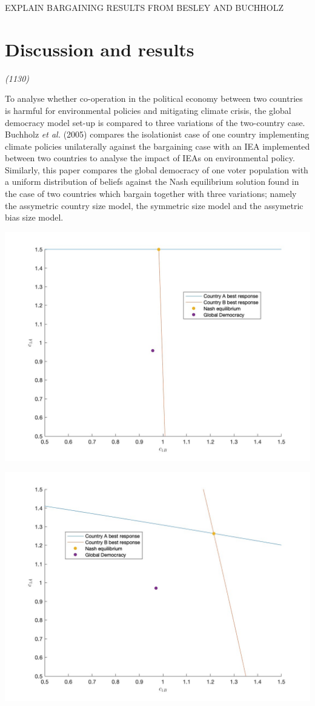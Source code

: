 \documentclass[11pt,preprint, authoryear]{elsarticle}
\let\origfigure\figure
\let\endorigfigure\endfigure
\renewenvironment{figure}[1][2] {
    \expandafter\origfigure\expandafter[H]
} {
    \endorigfigure
}
\numberwithin{equation}{section}
\numberwithin{figure}{section}
\numberwithin{table}{section}
\begin{document}
EXPLAIN BARGAINING RESULTS FROM BESLEY AND BUCHHOLZ

\hypertarget{discussion-and-results}{%
\section{Discussion and results}\label{discussion-and-results}}

\emph{(1130)}

To analyse whether co-operation in the political economy between two
countries is harmful for environmental policies and mitigating climate
crisis, the global democracy model set-up is compared to three
variations of the two-country case. Buchholz \emph{et al.} (2005)
compares the isolationist case of one country implementing climate
policies unilaterally against the bargaining case with an IEA
implemented between two countries to analyse the impact of IEAs on
environmental policy. Similarly, this paper compares the global
democracy of one voter population with a uniform distribution of beliefs
against the Nash equilibrium solution found in the case of two countries
which bargain together with three variations; namely the assymetric
country size model, the symmetric size model and the assymetric bias
size model.

\newpage

\begin{figure}[H]

{\centering \includegraphics[width=0.45\linewidth]{images/Fig2_0.1Size0Bias} 

}

\caption{Nash equilibrium for assymetric country size model}\label{fig:unnamed-chunk-2}
\end{figure}

\begin{figure}[H]

{\centering \includegraphics[width=0.45\linewidth]{images/Fig2_0.5Size0Bias} 

}

\caption{Nash equilibrium for symmetric country size model}\label{fig:unnamed-chunk-3}
\end{figure}
\end{document}
